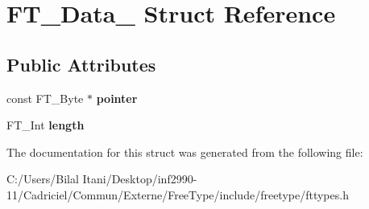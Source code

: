 \hypertarget{struct_f_t___data__}{}\section{F\+T\+\_\+\+Data\+\_\+ Struct Reference}
\label{struct_f_t___data__}
\subsection*{Public Attributes}
\begin{DoxyCompactItemize}
\item 
const F\+T\+\_\+\+Byte $\ast$ {\bfseries pointer}\hypertarget{struct_f_t___data___a4dea731b8a256b973757e1b8f612b050}{}\label{struct_f_t___data___a4dea731b8a256b973757e1b8f612b050}

\item 
F\+T\+\_\+\+Int {\bfseries length}\hypertarget{struct_f_t___data___af60c89dccd1852aceb0dc08675aca2fd}{}\label{struct_f_t___data___af60c89dccd1852aceb0dc08675aca2fd}

\end{DoxyCompactItemize}


The documentation for this struct was generated from the following file\+:\begin{DoxyCompactItemize}
\item 
C\+:/\+Users/\+Bilal Itani/\+Desktop/inf2990-\/11/\+Cadriciel/\+Commun/\+Externe/\+Free\+Type/include/freetype/fttypes.\+h\end{DoxyCompactItemize}
